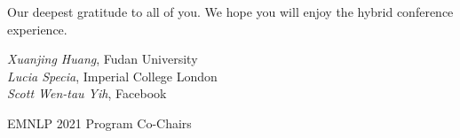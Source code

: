 Our deepest gratitude to all of you. We hope you will enjoy the hybrid conference experience.
\vspace{3em}

\noindent \textit{Xuanjing Huang}, Fudan University\\
\noindent \textit{Lucia Specia}, Imperial College London\\
\noindent \textit{Scott Wen-tau Yih}, Facebook

\noindent EMNLP 2021 Program Co-Chairs \\

